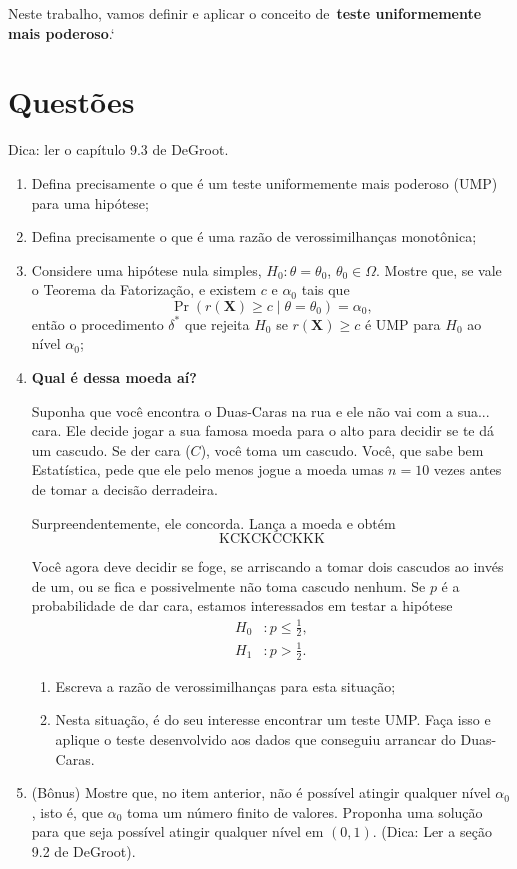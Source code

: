 \documentclass[a4paper,10pt, notitlepage]{report}
\newcommand{\pr}{\operatorname{Pr}} %
\newcommand{\bX}{\boldsymbol{X}} %
\begin{document}
Neste trabalho, vamos definir e aplicar o conceito de~\textbf{teste uniformemente mais poderoso}.`

\section*{Questões}
Dica: ler o capítulo 9.3 de DeGroot.
\begin{enumerate}
 \item Defina precisamente o que é um teste uniformemente mais poderoso (UMP) para uma hipótese;
 \item Defina precisamente o que é uma razão de verossimilhanças monotônica;
 \item Considere uma hipótese nula simples, $H_0: \theta = \theta_0$, $\theta_0 \in \Omega$.
 Mostre que, se vale o Teorema da Fatorização, e existem $c$ e $\alpha_0$ tais que
 \begin{equation}
  \pr\left(r(\bX) \geq c \mid \theta = \theta_0\right) = \alpha_0,
 \end{equation}
então o procedimento $\delta^\ast$ que rejeita $H_0$ se $r(\bX) \geq c$ é UMP para $H_0$ ao nível $\alpha_0$;

\item \textbf{Qual é dessa moeda aí?}

Suponha que você encontra o Duas-Caras na rua e ele não vai com a sua... cara. 
Ele decide jogar a sua famosa moeda para o alto para decidir se te dá um cascudo.
Se der cara ($C$), você toma um cascudo.
Você, que sabe bem Estatística, pede que ele pelo menos jogue a moeda umas $n=10$ vezes antes de tomar a decisão derradeira.

Surpreendentemente, ele concorda. 
Lança a moeda e obtém
$$ \text{KCKCKCCKKK} $$

Você agora deve decidir se foge, se arriscando a tomar dois cascudos ao invés de um, ou se fica e  possivelmente não toma cascudo nenhum.
Se $p$ é a probabilidade de dar cara, estamos interessados em testar a hipótese
  \begin{align*}
   H_0 &:  p \leq \frac{1}{2},\\
   H_1 &:p > \frac{1}{2}.
  \end{align*}

\begin{enumerate}
 \item Escreva a razão de verossimilhanças para esta situação;
 \item Nesta situação, é do seu interesse encontrar um teste UMP.
 Faça isso e aplique o teste desenvolvido aos dados que conseguiu arrancar do Duas-Caras.
\end{enumerate}
\item (Bônus) Mostre que, no item anterior, não é possível atingir qualquer nível $\alpha_0$, isto é, que $\alpha_0$ toma um número finito de valores.
Proponha uma solução para que seja possível atingir qualquer nível em $(0, 1)$. (Dica: Ler a seção 9.2 de DeGroot).
\end{enumerate}

% 
% 
\end{document}
